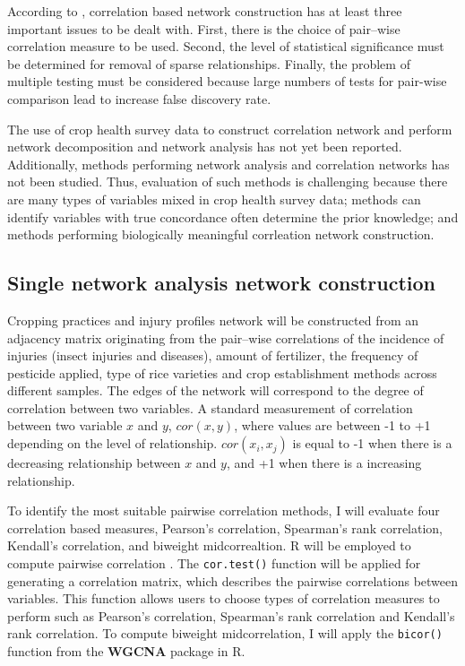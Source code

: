 According to , correlation based network construction has at least three important issues to be dealt with. First, there is the choice of pair--wise correlation measure to be used. Second, the level of statistical significance must be determined for removal of sparse relationships. Finally, the problem of multiple testing must be considered because large numbers of tests for pair-wise comparison lead to increase false discovery rate.

The use of crop health survey data to construct correlation network and perform network decomposition and network analysis has not yet been reported. Additionally, methods performing network analysis and correlation networks has not been studied. Thus, evaluation of such methods is challenging because there are many types of variables mixed in crop health survey data; methods can identify variables with true concordance often determine the prior knowledge; and methods performing biologically meaningful corrleation network construction. 


\subsection*{Single network analysis network construction}

Cropping practices and injury profiles network will be constructed from an adjacency matrix originating from the pair--wise correlations of the incidence of injuries (insect injuries and diseases), amount of fertilizer, the frequency of pesticide applied, type of rice varieties and crop establishment methods across different samples. The edges of the network will correspond to the degree of correlation between two variables. A standard measurement of correlation between two variable $x$ and $y$, $cor(x,y)$, where values are  between -1 to +1 depending on the level of relationship. $cor(x_{i}, x_{j})$ is equal to -1 when there is a decreasing relationship between $x$ and $y$, and +1 when there is a increasing relationship.

To identify the most suitable pairwise correlation methods, I will evaluate four correlation based measures, Pearson's correlation, Spearman's rank correlation, Kendall's correlation, and biweight midcorrealtion. R will be employed to compute pairwise correlation . The \texttt{cor.test()} function will be applied for generating a correlation matrix, which describes the pairwise correlations between variables. This function allows users to choose types of correlation measures to perform such as Pearson's correlation, Spearman's rank correlation and Kendall's rank correlation. To compute biweight midcorrelation, I will apply the \texttt{bicor()} function from the \textbf{WGCNA} package  in R. 

